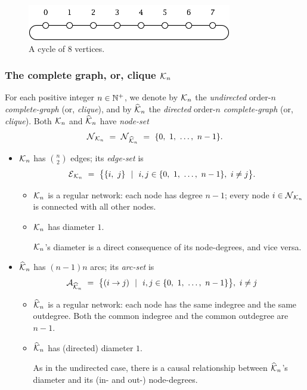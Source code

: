 \begin{figure}[hbt]
\begin{center}
       \includegraphics[scale=0.7]{FiguresGraph/cycle}
       \caption{A cycle of $8$ vertices.}
  \label{fig:cycle}
\end{center}
\end{figure}

\subsubsection{The complete graph, or, clique $\mbox{$\cal K$}_n$}
\label{sec:cliques}
 

For each positive integer $n \in \mathbb{N}^+$, we denote by $\mbox{$\cal K$}_n$ the {\em
  undirected} order-$n$ {\it complete-graph} (or, {\it clique}),
  and by $\widehat{\mbox{$\cal K$}}_n$ the {\em
  directed} order-$n$ {\it complete-graph} (or, {\it clique}).  Both
$\mbox{$\cal K$}_n$ and $\widehat{\mbox{$\cal K$}}_n$ have {\it node-set}
\[ \mbox{$\cal N$}_{{\cal K}_n} \ = \ \mbox{$\cal N$}_{\widehat{{\cal K}}_n}
\ = \ \{ 0, \ 1, \ \ldots, \ n-1\}. \]
\begin{itemize}
\item
$\mbox{$\cal K$}_n$ has $\displaystyle {n \choose 2}$ edges; its {\it edge-set} is
\[ \mbox{$\cal E$}_{{\cal K}_n} \ = \
\big\{ \{i, \ j\} \ \ | \ \ i,j \in \{0, \ 1, \ \ldots, \ n-1\}, \ i
\neq j \big\}.
\]
  \begin{itemize}
  \item {} 
$\mbox{$\cal K$}_n$ is a regular network: each node has degree $n-1$; every node $i
\in \mbox{$\cal N$}_{\mbox{{\scriptsize $\cal K$}}_n}$ is connected with all other nodes.

   \item {}
$\mbox{$\cal K$}_n$ has diameter $1$.

$\mbox{$\cal K$}_n$'s diameter is a direct consequence of its node-degrees, and vice versa.
  \end{itemize}

\item
$\widehat{\mbox{$\cal K$}}_n$ has $(n-1)n$ arcs; its {\it arc-set} is
\[ \a_{\widehat{{\cal K}}_n} \ = \ 
\big\{ (i \rightarrow j) \ \ | \ \ i,j \in \{0, \ 1, \ \ldots, \ n-1\}
\big\}, \ i \neq j
\]
  \begin{itemize}
  \item
$\widehat{\mbox{$\cal K$}}_n$ is a regular network: each node has the same indegree
    and the same outdegree.  Both the common indegree and the common
    outdegree are $n-1$.
  \item
$\widehat{\mbox{$\cal K$}}_n$ has (directed) diameter $1$.

As in the undirected case, there is a causal relationship between
$\widehat{\mbox{$\cal K$}}_n$'s diameter and its (in- and out-) node-degrees.
  \end{itemize}
\end{itemize}

